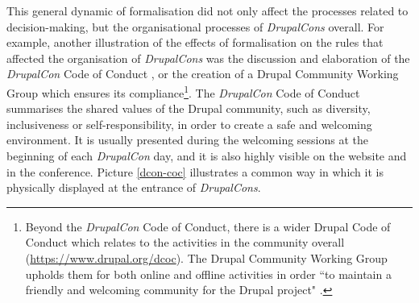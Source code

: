 This general dynamic of formalisation did not only affect the processes related to decision-making, but the organisational processes of \textit{DrupalCons} overall. For example, another illustration of the effects of formalisation on the rules that affected the organisation of \textit{DrupalCons} was the discussion and elaboration of the \textit{DrupalCon} Code of Conduct \parencite{drupalcon-coc:2016:Online}, or the creation of a Drupal Community Working Group \parencite{drupal-cwc:2016:Online} which ensures its compliance\footnote{Beyond the \textit{DrupalCon} Code of Conduct, there is a wider Drupal Code of Conduct which relates to the activities in the community overall (\url{https://www.drupal.org/dcoc}). The Drupal Community Working Group upholds them for both online and offline activities in order ``to maintain a friendly and welcoming community for the Drupal project" \parencite{drupal-cwc:2016:Online}.}. The \textit{DrupalCon} Code of Conduct summarises the shared values of the Drupal community, such as diversity, inclusiveness or self-responsibility, in order to create a safe and welcoming environment. It is usually presented during the welcoming sessions at the beginning of each \textit{DrupalCon} day, and it is also highly visible on the website and in the conference. Picture \ref{dcon-coc} illustrates a common way in which it is physically displayed at the entrance of \textit{DrupalCons}.

